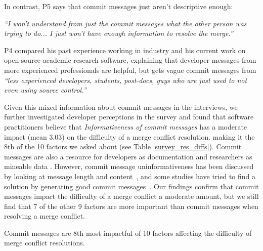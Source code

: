 In contrast, P5 says that commit messages just aren't descriptive enough:
\begin{displayquote}
\textit{``I won't understand from just the commit messages what the other person was trying to do... I just won't have enough information to resolve the merge.''}
\end{displayquote}

P4 compared his past experience working in industry and his current work on open-source academic research software, explaining that developer messages from more experienced professionals are helpful, but gets vague commit messages from \textit{``less experienced developers, students, post-docs, guys who are just used to not even using source control.''}

Given this mixed information about commit messages in the interviews, we further investigated developer perceptions in the survey and found that software practitioners believe that \textit{Informativeness of commit messages} has a moderate impact (mean 3.03) on the difficulty of a merge conflict resolution. making it the 8th  of the 10 factors we asked about (see Table \ref{survey_res_diffs}). Commit messages are also a resource for developers as documentation and researchers as mineable data \cite{d2010commit}. However, commit message uninformativeness has been discussed by looking at message length and content~\cite{maalej2010can}, and some studies have tried to find a solution by generating good commit messages~\cite{cortes2014}. Our findings confirm that commit messages impact the difficulty of a merge conflict a moderate amount, but we still find that 7 of the other 9 factors are more important than commit messages when resolving a merge conflict.

\begin{tcolorbox}[enhanced,minipage boxed title,enhanced,title={Takeaway \arabic{takeawaycounter}},
attach boxed title to top left=
{xshift=0mm,yshift=-1mm},
boxed title style={size=small}]
Commit messages are 8th most impactful of 10 factors affecting the difficulty of merge conflict resolutions.
\end{tcolorbox}
\addtocounter{takeawaycounter}{1}


